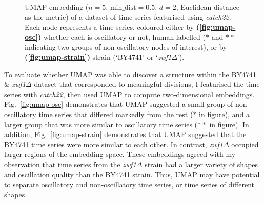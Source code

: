 \begin{figure}
  \caption[
      UMAP embedding of a dataset of time series featurised using \textit{catch22}.
    ]{
      UMAP embedding ($n=5$, $\mathrm{min\_dist} = 0.5$, $d=2$, Euclidean distance as the metric) of a dataset of time series featurised using \textit{catch22}.
      Each node represents a time series, coloured either by
      \textbf{(\ref{fig:umap-osc})}
      whether each is oscillatory or not, human-labelled ($\ast$ and $\ast \ast$ indicating two groups of non-oscillatory nodes of interest), or by
      \textbf{(\ref{fig:umap-strain})}
      strain (`BY4741' or `\textit{zwf1$\Delta$}').
    }
  \label{fig:umap}
\end{figure}

To evaluate whether UMAP was able to discover a structure within the BY4741 \& \textit{zwf1$\Delta$} dataset that corresponded to meaningful divisions, I featurised the time series with \textit{catch22}, then used UMAP to compute two-dimensional embeddings.
Fig.\ \ref{fig:umap-osc} demonstrates that UMAP suggested a small group of non-oscillatory time series that differed markedly from the rest ($\ast$ in figure), and a larger group that was more similar to oscillatory time series ($\ast \ast$ in figure).
In addition, Fig.\ \ref{fig:umap-strain} demonstrates that UMAP suggested that the BY4741 time series were more similar to each other.
In contrast, \textit{zwf1$\Delta$} occupied larger regions of the embedding space.
These embeddings agreed with my observation that time series from the \textit{zwf1$\Delta$} strain had a larger variety of shapes and oscillation quality than the BY4741 strain.
Thus, UMAP may have potential to separate oscillatory and non-oscillatory time series, or time series of different shapes.



